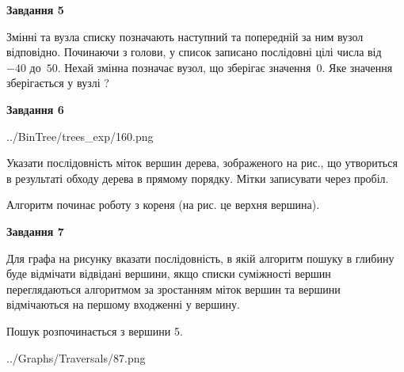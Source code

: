 \documentclass[12pt, ukrainian]{article}
\begin{document}
{\begin {large}
{\begin {center}\textbf{Завдання 5}\end {center}}\par
Змінні  та  вузла списку позначають наступний та попередній за ним вузол відповідно. Починаючи з голови, у список записано послідовні цілі числа від~$-40$ до~$50$. Нехай змінна  позначає вузол, що зберігає значення~$0$.
Яке значення зберігається у вузлі  ?\par
\newpage

{\begin {center}\textbf{Завдання 6}\end {center}}\par

\begin{center}
	{../BinTree/trees_exp/160.png}
\end{center}
Указати послідовність міток вершин дерева, зображеного на рис., що утвориться в результаті обходу дерева в прямому порядку. Мітки записувати через пробіл.\par Алгоритм починає роботу з кореня (на рис. це верхня вершина).\par
\newpage

{\begin {center}\textbf{Завдання 7}\end {center}}\par
Для графа на рисунку вказати послідовність, в якій алгоритм пошуку в глибину буде відмічати відвідані вершини, якщо списки суміжності вершин переглядаються алгоритмом за зростанням міток вершин та вершини відмічаються на першому вход\-женні у вершину.\par
Пошук розпочинається з вершини 5.\par

\begin{center}
	{../Graphs/Traversals/87.png}
\end{center}\par
\newpage


\end{large}}
\end{document}
